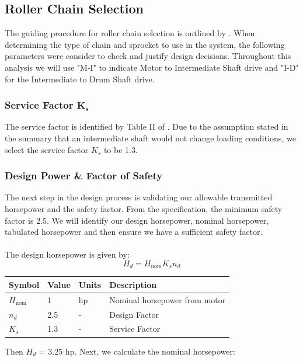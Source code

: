 \documentclass[letterpaper,12pt]{article}
\begin{document}
\subsection{Roller Chain Selection}
The guiding procedure for roller chain selection is outlined by \cite{martin}. When determining the type of chain and sprocket to use in the system, the following parameters were consider to check and justify design decisions. Throughout this analysis we will use "M-I" to indicate Motor to Intermediate Shaft drive and "I-D" for the Intermediate to Drum Shaft drive.

\subsubsection{Service Factor $\bm{K_s}$}
The service factor is identified by Table II of \cite{martin}. Due to the assumption stated in the summary that an intermediate shaft would not change loading conditions, we select the service factor $K_s$ to be 1.3.

\subsubsection{Design Power \& Factor of Safety}
The next step in the design process is validating our allowable transmitted horsepower and the safety factor. From the specification, the minimum safety factor is 2.5. We will identify our design horsepower, nominal horsepower, tabulated horsepower and then ensure we have a sufficient safety factor.
\\\\
The design horsepower is given by:
\begin{equation}
    H_d = H_{\text{nom}}K_s n_d
\end{equation}

\begin{center}
	\begin{tabular}{ |p{1.5cm}||p{1cm}|p{2cm}|p{7cm}|  }
		\hline
		Symbol & Value & Units & Description\\
		\hline
		$H_{\text{nom}}$ & 1 & hp & Nominal horsepower from motor\\
        $n_d$ & 2.5 & -  & Design Factor\\			
		$K_s$ & 1.3 & -  & Service Factor\\
		\hline
	\end{tabular}
\end{center}
Then $H_d$ = 3.25 hp. Next, we calculate the nominal horsepower:
\end{document}
